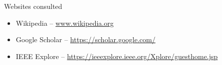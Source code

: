 \cleardoublepage
{}
{}
\printbibliography[title=References]
\nocite{*}
\vspace{2.5cm}
\begin{Large}Websites consulted\end{Large}
\begin{itemize}
\item Wikipedia -- \url{www.wikipedia.org}
\item Google Scholar -- \url{https://scholar.google.com/}
\item IEEE Explore -- \url{https://ieeexplore.ieee.org/Xplore/guesthome.jsp}

\end{itemize}

